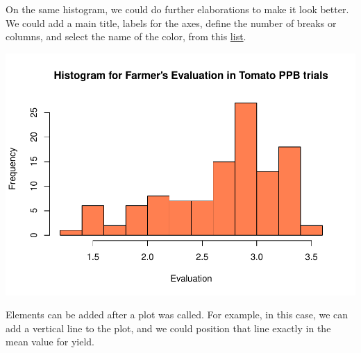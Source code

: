 \documentclass[
]{book}
\newenvironment{Shaded}{\begin{snugshade}}{\end{snugshade}}
\newcommand{\AttributeTok}[1]{\textcolor[rgb]{0.77,0.63,0.00}{#1}}
\newcommand{\CommentTok}[1]{\textcolor[rgb]{0.56,0.35,0.01}{\textit{#1}}}
\newcommand{\DecValTok}[1]{\textcolor[rgb]{0.00,0.00,0.81}{#1}}
\newcommand{\FunctionTok}[1]{\textcolor[rgb]{0.00,0.00,0.00}{#1}}
\newcommand{\NormalTok}[1]{#1}
\newcommand{\SpecialCharTok}[1]{\textcolor[rgb]{0.00,0.00,0.00}{#1}}
\newcommand{\StringTok}[1]{\textcolor[rgb]{0.31,0.60,0.02}{#1}}
\begin{document}
On the same histogram, we could do further elaborations to make it look better. We could add a main title, labels for the axes, define the number of breaks or columns, and select the name of the color, from this \href{http://www.stat.columbia.edu/~tzheng/files/Rcolor.pdf}{list}.

\begin{Shaded}
\end{Shaded}

\includegraphics{PPB-Toolkit-for-R-and-R-Studio_files/figure-latex/unnamed-chunk-59-1.pdf}

Elements can be added after a plot was called. For example, in this case, we can add a vertical line to the plot, and we could position that line exactly in the mean value for yield.
\end{document}
